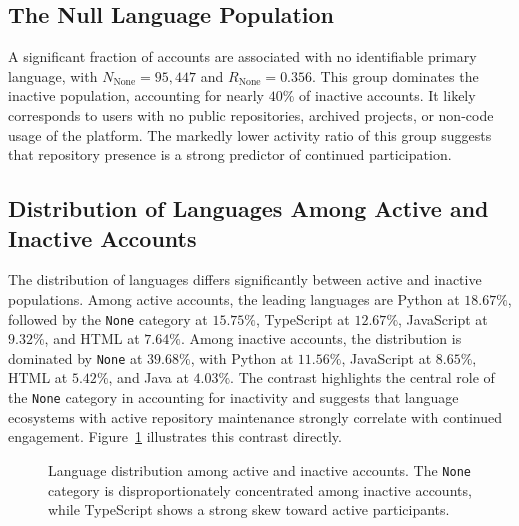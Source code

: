 \documentclass[12pt,a4paper]{article}
\begin{document}
\subsection{The Null Language Population}

A significant fraction of accounts are associated with no identifiable primary language, with $N_{\text{None}} = 95{,}447$ and $R_{\text{None}} = 0.356$. This group dominates the inactive population, accounting for nearly $40\%$ of inactive accounts. It likely corresponds to users with no public repositories, archived projects, or non-code usage of the platform. The markedly lower activity ratio of this group suggests that repository presence is a strong predictor of continued participation.

\subsection{Distribution of Languages Among Active and Inactive Accounts}

The distribution of languages differs significantly between active and inactive populations. Among active accounts, the leading languages are Python at $18.67\%$, followed by the \texttt{None} category at $15.75\%$, TypeScript at $12.67\%$, JavaScript at $9.32\%$, and HTML at $7.64\%$. Among inactive accounts, the distribution is dominated by \texttt{None} at $39.68\%$, with Python at $11.56\%$, JavaScript at $8.65\%$, HTML at $5.42\%$, and Java at $4.03\%$. The contrast highlights the central role of the \texttt{None} category in accounting for inactivity and suggests that language ecosystems with active repository maintenance strongly correlate with continued engagement. Figure~\ref{fig:composition} illustrates this contrast directly.

\begin{figure}[h]
\centering
{}
\caption{Language distribution among active and inactive accounts. The \texttt{None} category is disproportionately concentrated among inactive accounts, while TypeScript shows a strong skew toward active participants.}
\label{fig:composition}
\end{figure}
\end{document}
